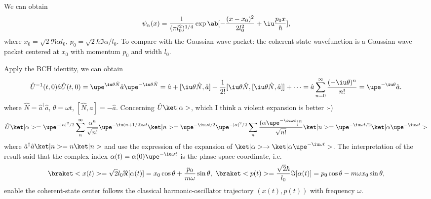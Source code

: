 \begin{solution}
\begin{enumext}
    We can obtain
    \[
      \psi_\alpha(x) = \frac1{(\pi l_0^2)^{1/4}}\exp\ab[-\frac{(x - x_0)^2}{2l_0^2} + \iu\frac{p_0x}{\hbar}],
    \]
    where $x_0 = \sqrt2\Re\alpha l_0$, $p_0 = \sqrt2\hbar\Im\alpha/l_0$.
    To compare with the Gaussian wave packet:
    the coherent-state wavefunction is a Gaussian wave packet centered at $x_0$ with momentum $p_0$ and width $l_0$.
    \item Apply the BCH identity, we can obtain
    \[
      \hat U^{-1}(t,0) \hat a \hat U(t,0)
    = \upe^{\iu\theta\hat N} \hat a \upe^{-\iu\theta\hat N}
    = \hat a + [\iu\theta\hat N, \hat a] + \frac1{2!}[\iu\theta\hat N, [\iu\theta\hat N, \hat a]] + \cdots
    = \hat a \sum_{n=0}^\infty \frac{(-\iu\theta)^n}{n!} = \upe^{-\iu\theta} \hat a.
    \]
    where $\hat N = \hat a^\dagger \hat a$, $\theta = \omega t$, $[\hat N, \hat a] = -\hat a$.
    Concerning $\hat U\ket|\alpha>$, which I think a violent expansion is better \textsf{:-)}
    \[
      \hat U\ket|\alpha> = \upe^{-|\alpha|^2/2} \sum_{n}^\infty \frac{\alpha^n}{\sqrt{n!}} \upe^{-\iu(n+1/2)\omega t} \ket|n>
    = \upe^{-\iu\omega t/2} \upe^{-|\alpha|^2/2} \sum_n \frac{(\alpha \upe^{-\iu\omega t})^n}{\sqrt{n!}}\ket|n>
    = \upe^{-\iu\omega t/2} \ket|\alpha \upe^{-\iu\omega t}>
    \]
    where $\hat a^\dagger \hat a \ket|n> = n\ket|n>$ and use the expression of the expansion of
    $\ket|\alpha> \to \ket|\alpha \upe^{-\iu\omega t}>$.
    The interpretation of the result said that the complex index $\alpha(t) = \alpha(0)\upe^{-\iu\omega t}$
    is the phase-space coordinate, i.e.
    \[
      \braket<x(t)> = \sqrt2l_0\Re[\alpha(t)] = x_0 \cos\theta + \frac{p_0}{m\omega}\sin\theta, ~
      \braket<p(t)> = \frac{\sqrt2\hbar}{l_0}\Im[\alpha(t)] = p_0 \cos\theta - m\omega x_0\sin\theta,
    \]
    enable the coherent-state center follows the classical harmonic-oscillator trajectory $(x(t), p(t))$
    with frequency $\omega$.
  \end{enumext}
\end{solution}

\newpage

